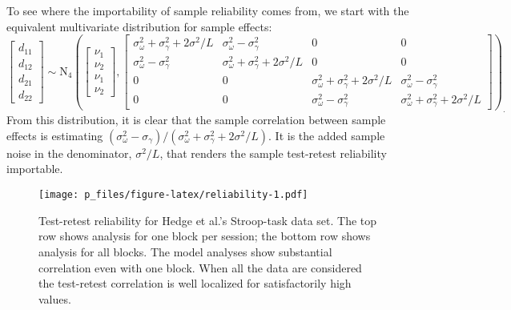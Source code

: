 \documentclass[english,man]{apa6}
\theoremstyle{definition}
\theoremstyle{definition}
\theoremstyle{remark}
\begin{document}
To see where the importability of sample reliability comes from, we
start with the equivalent multivariate distribution for sample effects:
\[
\begin{bmatrix} d_{11} \\ d_{12} \\ d_{21} \\ d_{22} \end{bmatrix}
\sim \mbox{N}_4\left(
\begin{bmatrix} \nu_1 \\ \nu_2 \\ \nu_1 \\ \nu_2 \end{bmatrix},
\begin{bmatrix} 
\sigma^2_\omega+\sigma^2_\gamma +2\sigma^2/L& \sigma^2_\omega-\sigma^2_\gamma & 0 & 0\\ 
\sigma^2_\omega-\sigma^2_\gamma & \sigma^2_\omega+\sigma^2_\gamma + 2\sigma^2/L& 0 & 0\\
0 & 0 &\sigma^2_\omega+\sigma^2_\gamma + 2\sigma^2/L& \sigma^2_\omega-\sigma^2_\gamma \\ 
0 & 0 & \sigma^2_\omega-\sigma^2_\gamma & \sigma^2_\omega+\sigma^2_\gamma + 2\sigma^2/L
\end{bmatrix}
\right)_.
\] From this distribution, it is clear that the sample correlation
between sample effects is estimating
\((\sigma^2_\omega-\sigma_\gamma)/(\sigma^2_\omega+\sigma^2_\gamma+2\sigma^2/L)\).
It is the added sample noise in the denominator, \(\sigma^2/L\), that
renders the sample test-retest reliability importable.

\begin{figure}[htbp]
\centering
\texttt{[image: p\_files/figure-latex/reliability-1.pdf]}
\caption{\label{fig:reliability}Test-retest reliability for Hedge et al.'s
Stroop-task data set. The top row shows analysis for one block per
session; the bottom row shows analysis for all blocks. The model
analyses show substantial correlation even with one block. When all the
data are considered the test-retest correlation is well localized for
satisfactorily high values.}
\end{figure}
\end{document}
